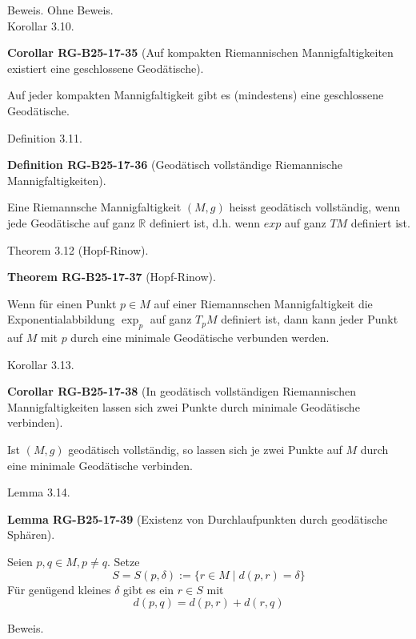 \documentclass[10pt, letterpaper]{article}
\newcommand{\CustomHeading}[3]{%
  \par\medskip\noindent%
  \textbf{#1 #2} \textnormal{(#3)}.\enskip%
}
\newenvironment{DEF}[2]{\begin{unitbox}\CustomHeading{Definition}{#1}{#2}}{\end{unitbox}}
\newenvironment{THEO}[2]{\begin{unitbox}\CustomHeading{Theorem}{#1}{#2}}{\end{unitbox}}
\newenvironment{LEM}[2]{\begin{unitbox}\CustomHeading{Lemma}{#1}{#2}}{\end{unitbox}}
\newenvironment{KORO}[2]{\begin{unitbox}\CustomHeading{Corollar}{#1}{#2}}{\end{unitbox}}
\begin{document}
Beweis. Ohne Beweis.\\



Korollar 3.10. 

\begin{KORO}{RG-B25-17-35}{Auf kompakten Riemannischen Mannigfaltigkeiten existiert eine geschlossene Geodätische}
Auf jeder kompakten Mannigfaltigkeit gibt es (mindestens) eine geschlossene Geodätische.
\end{KORO}


Definition 3.11. 


\begin{DEF}{RG-B25-17-36}{Geodätisch vollständige Riemannische Mannigfaltigkeiten}
Eine Riemannsche Mannigfaltigkeit $(M, g)$ heisst geodätisch vollständig, wenn jede Geodätische auf ganz $\mathbb{R}$ definiert ist, d.h. wenn $exp$ auf ganz $TM$ definiert ist.
\end{DEF}


Theorem 3.12 (Hopf-Rinow). 


\begin{THEO}{RG-B25-17-37}{Hopf-Rinow}
Wenn für einen Punkt $p \in M$ auf einer Riemannschen Mannigfaltigkeit die Exponentialabbildung $\exp _{p}$ auf ganz $T_{p} M$ definiert ist, dann kann jeder Punkt auf $M$ mit $p$ durch eine minimale Geodätische verbunden werden.
\end{THEO}



Korollar 3.13. 

\begin{KORO}{RG-B25-17-38}{In geodätisch vollständigen Riemannischen Mannigfaltigkeiten lassen sich zwei Punkte durch minimale Geodätische verbinden}
Ist $(M, g)$ geodätisch vollständig, so lassen sich je zwei Punkte auf $M$ durch eine minimale Geodätische verbinden.
\end{KORO}



Lemma 3.14. 


\begin{LEM}{RG-B25-17-39}{Existenz von Durchlaufpunkten durch geodätische Sphären}
Seien $p, q \in M, p \neq q$. Setze
$$
S=S(p, \delta):=\{r \in M \mid d(p, r)=\delta\}
$$
Für genügend kleines $\delta$ gibt es ein $r \in S$ mit
$$
d(p, q)=d(p, r)+d(r, q)
$$
\end{LEM}



Beweis. 
\end{document}
